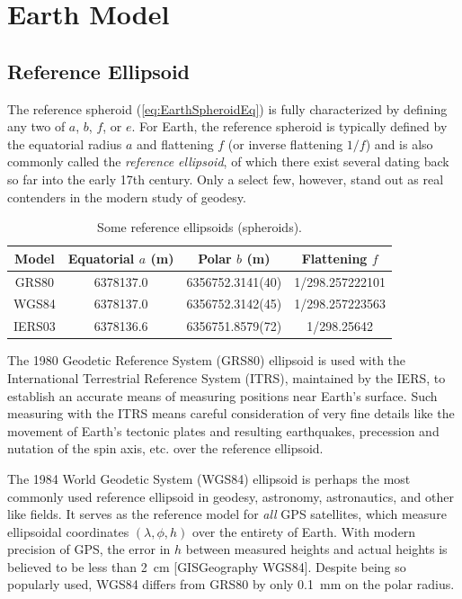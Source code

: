 \documentclass[11pt,dvipsnames]{thesis}
\begin{document}
\newpage
\chapter{Earth Model}


\section{Reference Ellipsoid}
The reference spheroid (\ref{eq:EarthSpheroidEq}) is fully characterized by defining any two of $a$, $b$, $f$, or $e$. For Earth, the reference spheroid is typically defined by the equatorial radius $a$ and flattening $f$ (or inverse flattening $1/f$) and is also commonly called the \textit{reference ellipsoid}, of which there exist several dating back so far into the early 17th century. Only a select few, however, stand out as real contenders in the modern study of geodesy. 
\begin{table}[H]
\centering
\caption{Some reference ellipsoids (spheroids).}
\label{tab:ReferenceEllipsoids}
\begin{tabular}{SSSS}
\toprule
{Model} & {Equatorial $a$ (\si{\m})} & {Polar $b$ (\si{\m})} & {Flattening $f$} \\ \midrule
{GRS80}  & {\num{6378137.0}} & 6356752.3141(40) & \num{1/298.257222101} \\
{WGS84}  & {\num{6378137.0}} & 6356752.3142(45) & \num{1/298.257223563} \\
{IERS03} & {\num{6378136.6}} & 6356751.8579(72) & \num{1/298.25642}\hspace{5ex} \\ \bottomrule
\end{tabular}
\end{table}
The 1980 Geodetic Reference System (GRS80) ellipsoid is used with the International Terrestrial Reference System (ITRS), maintained by the IERS, to establish an accurate means of measuring positions near Earth's surface. Such measuring with the ITRS means careful consideration of very fine details like the movement of Earth's tectonic plates and resulting earthquakes, precession and nutation of the spin axis, etc. over the reference ellipsoid.

The 1984 World Geodetic System (WGS84) ellipsoid is perhaps the most commonly used reference ellipsoid in geodesy, astronomy, astronautics, and other like fields. It serves as the reference model for \textit{all} GPS satellites, which measure ellipsoidal coordinates $(\lambda, \phi, h)$ over the entirety of Earth. With modern precision of GPS, the error in $h$ between measured heights and actual heights is believed to be less than \SI{2}{\cm} [GISGeography WGS84]. Despite being so popularly used, WGS84 differs from GRS80 by only \SI{0.1}{\mm} on the polar radius.
\end{document}
